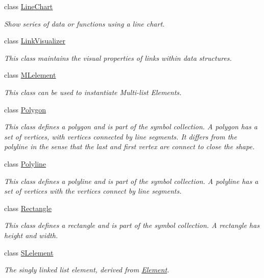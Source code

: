 \begin{DoxyCompactItemize}
class \hyperlink{classbridges_1_1datastructure_1_1_line_chart}{Line\+Chart}
\begin{DoxyCompactList}\small\item\em Show series of data or functions using a line chart. \end{DoxyCompactList}\item 
class \hyperlink{classbridges_1_1datastructure_1_1_link_visualizer}{Link\+Visualizer}
\begin{DoxyCompactList}\small\item\em This class maintains the visual properties of links within data structures. \end{DoxyCompactList}\item 
class \hyperlink{classbridges_1_1datastructure_1_1_m_lelement}{M\+Lelement}
\begin{DoxyCompactList}\small\item\em This class can be used to instantiate Multi-\/list Elements. \end{DoxyCompactList}\item 
class \hyperlink{classbridges_1_1datastructure_1_1_polygon}{Polygon}
\begin{DoxyCompactList}\small\item\em This class defines a polygon and is part of the symbol collection. A polygon has a set of vertices, with vertices connected by line segments. It differs from the polyline in the sense that the last and first vertex are connect to close the shape. \end{DoxyCompactList}\item 
class \hyperlink{classbridges_1_1datastructure_1_1_polyline}{Polyline}
\begin{DoxyCompactList}\small\item\em This class defines a polyline and is part of the symbol collection. A polyline has a set of vertices with the vertices connect by line segments. \end{DoxyCompactList}\item 
class \hyperlink{classbridges_1_1datastructure_1_1_rectangle}{Rectangle}
\begin{DoxyCompactList}\small\item\em This class defines a rectangle and is part of the symbol collection. A rectangle has height and width. \end{DoxyCompactList}\item 
class \hyperlink{classbridges_1_1datastructure_1_1_s_lelement}{S\+Lelement}
\begin{DoxyCompactList}\small\item\em The singly linked list element, derived from \hyperlink{classbridges_1_1datastructure_1_1_element}{Element}. \end{DoxyCompactList}\item 

\end{DoxyCompactItemize}
